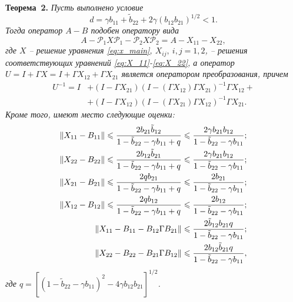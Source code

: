 \textbf{Теорема~2.}
{ \it Пусть выполнено условие
\begin{equation}
d = \gamma b_{11} + \tilde{b}_{22} + 2\gamma (b_{12}b_{21})^{1/2} < 1.
\label{cond_of_simil}
\end{equation}
Тогда оператор $A - B$ подобен оператору вида
\begin{equation*}
A - \mathcal{P}_1 X \mathcal{P}_1 - \mathcal{P}_2 X \mathcal{P}_2 = A - X_{11} - X_{22},
\end{equation*}
где $X$ -- решение уравнения \eqref{eq:x_main}, $X_{ij},\ i,j=1,2$, -- решения соответствующих уравнений \eqref{eq:X_11}-\eqref{eq:X_22}, а оператор
$U = I + \Gamma X = I + \Gamma X_{12} + \Gamma X_{21}$ является оператором преобразования, причем
\begin{equation}\label{eq:inverse_U}
	\begin{split}
		U^{-1} = I &+ (I - \Gamma X_{21})(I - (\Gamma X_{12})\Gamma X_{21})^{-1}\Gamma X_{12} + \\
				   &+ (I - \Gamma X_{12})(I - (\Gamma X_{21})\Gamma X_{12})^{-1}\Gamma X_{21}.
	\end{split}
\end{equation}
Кроме того, имеют место следующие оценки:
\begin{align}
	\left\|X_{11} - B_{11}\right\| \leqslant \frac{2 b_{21} \tilde b_{12}}{1 - \tilde b_{22}-\gamma b_{11}+q} &\leqslant \frac{2\gamma b_{21}b_{12}}{1-\tilde b_{22} - \gamma b_{11}}; \label{eq:ineq1} \\
	\left\|X_{22} - B_{22}\right\| \leqslant \frac{2 b_{12} \tilde b_{21}}{1 - \tilde b_{22}-\gamma b_{11}+q} &\leqslant \frac{2\gamma b_{21}b_{12}}{1-\tilde b_{22} - \gamma b_{11}}; \label{eq:ineq2} \\
	\left\|X_{21} - B_{21}\right\| \leqslant \frac{2 q b_{21}}{1 - \tilde b_{22}-\gamma b_{11}+q} &\leqslant \frac{2 b_{21}}{1-\tilde b_{22} - \gamma b_{11}}; \label{eq:ineq3} \\
	\left\|X_{12} - B_{12}\right\| \leqslant \frac{2 q b_{12}}{1 - \tilde b_{22}-\gamma b_{11}+q} &\leqslant \frac{2 b_{12}}{1-\tilde b_{22} - \gamma b_{11}}; \label{eq:ineq4} \\
	\left\|X_{11} - B_{11} - B_{12}\Gamma B_{21}\right\| &\leqslant \frac{2 \tilde b_{12} b_{21} q}{1-\tilde b_{22} - \gamma b_{11}}; \label{eq:ineq5} \\
	\left\|X_{22} - B_{22} - B_{21}\Gamma B_{12}\right\| &\leqslant \frac{2 b_{12} \tilde b_{21} q}{1-\tilde b_{22} - \gamma b_{11}}, \label{eq:ineq6}
\end{align}
где $q = [(1 - \tilde b_{22} - \gamma b_{11})^2 - 4 \gamma b_{12} b_{21}]^{1/2}$.
}

